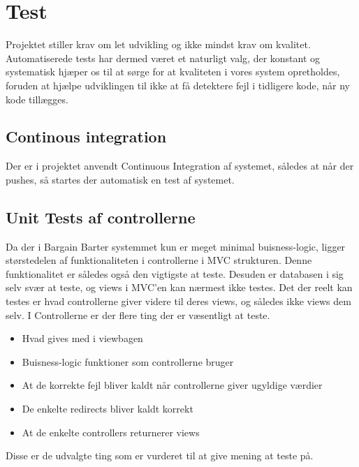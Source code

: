 \chapter{Test}

Projektet stiller krav om let udvikling og ikke mindst krav om kvalitet. Automatiserede tests har dermed været et naturligt valg, der konstant og systematisk hjæper os til at sørge for at kvaliteten i vores system opretholdes, foruden at hjælpe udviklingen til ikke at få detektere fejl i tidligere kode, når ny kode tillægges.

\section{Continous integration}
Der er i projektet anvendt Continuous Integration af systemet, således at når der pushes, så startes der automatisk en test af systemet.



\section{Unit Tests af controllerne}
Da der i Bargain Barter systemmet kun er meget minimal buisness-logic, ligger størstedelen af funktionaliteten i controllerne i MVC strukturen. Denne funktionalitet er således også den vigtigste at teste. Desuden er databasen i sig selv svær at teste, og views i MVC'en kan nærmest ikke testes. Det der reelt kan testes er hvad controllerne giver videre til deres views, og således ikke views dem selv. I Controllerne er der flere ting der er væsentligt at teste.
\begin{itemize}
	\item Hvad gives med i viewbagen
	\item Buisness-logic funktioner som controllerne bruger
	\item At de korrekte fejl bliver kaldt når controllerne giver ugyldige værdier
	\item De enkelte redirects bliver kaldt korrekt
	\item At de enkelte controllers returnerer views
\end{itemize}       
Disse er de udvalgte ting som er vurderet til at give mening at teste på.

